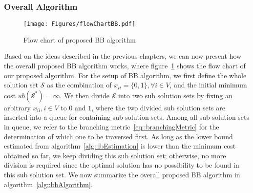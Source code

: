 \subsubsection{Overall Algorithm}
\begin{figure}
\begin{center}
\texttt{[image: Figures/flowChartBB.pdf]}
\caption{\label{fig::flowChartBB}Flow chart of proposed BB algorithm}
\end{center}
\end{figure}
Based on the ideas described in the previous chapters, we can now present how the overall proposed BB algorithm works, where figure~\ref{fig::flowChartBB} shows the flow chart of our proposed algorithm.
For the setup of BB algorithm, we first define the whole solution set $\mathcal{S}$ as the combination of $x_{ii} = \{0,1\}, \forall i \in V$, and the initial minimum cost $ub(\mathcal{S}^*) = \infty$.
We then divide $\mathcal{S}$ into two sub solution sets by fixing an arbitrary $x_{ii}, i \in V$ to $0$ and $1$, where the two divided sub solution sets are inserted into a queue for containing sub solution sets.
Among all sub solution sets in queue, we refer to the branching metric~\eqref{eq::branchingMetric} for the determination of which one to be traversed first.
As long as the lower bound estimated from algorithm~\ref{alg::lbEstimation} is lower than the minimum cost obtained so far, we keep dividing this sub solution set; otherwise, no more division is required since the optimal solution has no possibility to be found in this sub solution set.
We now summarize the overall proposed BB algorithm in algorithm~\ref{alg::bbAlgorithm}.
\IncMargin{1em}
